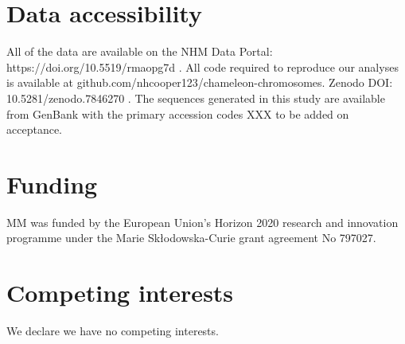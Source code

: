 \documentclass[a4paper, 12pt]{article}
\begin{document}
\section{Data accessibility}\label{data-code-and-materials}
All of the data are available on the NHM Data Portal: https://doi.org/10.5519/rmaopg7d \citep{chameleon-data}. 
All code required to reproduce our analyses is available at github.com/nhcooper123/chameleon-chromosomes. Zenodo DOI: 10.5281/zenodo.7846270 \citep{coopercode2022}. 
The sequences generated in this study are available from GenBank with the primary accession codes XXX to be added on acceptance.

\section{Funding}
MM was funded by the European Union’s Horizon 2020 research and innovation programme under the Marie Sk\l{}odowska-Curie grant agreement No 797027.

\section{Competing interests}
We declare we have no competing interests.
\end{document}
